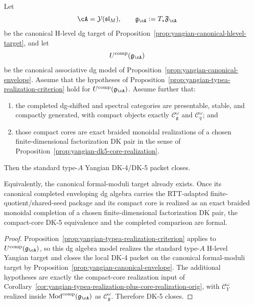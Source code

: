\begin{corollary}
\label{cor:yangian-formal-moduli-plus-core-realization-orig}
Let
\[
\cA=\mathcal{Y}(\mathfrak{sl}_M),
\qquad
\mathfrak{g}_{\cA}:=T_*\mathfrak{F}_{\cA}
\]
be the canonical H-level dg target of
Proposition~\ref{prop:yangian-canonical-hlevel-target}, and let
\[
U^{\mathrm{comp}}(\mathfrak{g}_{\cA})
\]
be the canonical associative dg model of
Proposition~\ref{prop:yangian-canonical-envelope}. Assume that the
hypotheses of Proposition~\ref{prop:yangian-typea-realization-criterion}
hold for \(U^{\mathrm{comp}}(\mathfrak{g}_{\cA})\). Assume further
that:
\begin{enumerate}[label=\textup{(\roman*)}]
\item the completed dg-shifted and spectral categories are presentable,
 stable, and compactly generated, with compact objects exactly
 $\mathcal{C}_{\mathfrak g}^\omega$ and $\mathcal{C}_q^\omega$; and
\item those compact cores are exact braided monoidal realizations of
 a chosen finite-dimensional factorization DK pair in the sense of
 Proposition~\ref{prop:yangian-dk5-core-realization}.
\end{enumerate}
Then the standard type-$A$ Yangian DK-4/DK-5 packet closes.

Equivalently, the canonical formal-moduli target already exists. Once
its canonical completed enveloping dg algebra carries the RTT-adapted
finite-quotient/shared-seed package and its compact core is realized as
an exact braided monoidal completion of a chosen finite-dimensional
factorization DK pair, the compact-core DK-5 equivalence and the
completed comparison are formal.
\end{corollary}

\begin{proof}
Proposition~\ref{prop:yangian-typea-realization-criterion} applies to
\(U^{\mathrm{comp}}(\mathfrak{g}_{\cA})\), so this dg algebra model realizes the
standard type-$A$ H-level Yangian target and closes the local DK-4
packet on the canonical formal-moduli target by
Proposition~\ref{prop:yangian-canonical-envelope}. The additional
hypotheses are exactly the compact-core realization input of
Corollary~\ref{cor:yangian-typea-realization-plus-core-realization-orig},
with \(\mathcal{C}_Y^\omega\) realized inside
\(\operatorname{Mod}^{\mathrm{comp}}(\mathfrak{g}_{\cA})\) as
\(\mathcal{C}_{\mathfrak g}^\omega\). Therefore DK-5 closes.
\end{proof}

